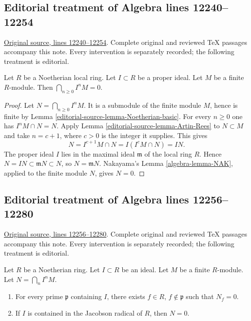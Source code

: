 \subsection{Editorial treatment of Algebra lines 12240--12254}

\hypertarget{algebra-context-161}{}

\noindent\href{https://github.com/stacks/stacks-project/blob/a04446e57ec1fbc252a871afcec7752fb2807b14/algebra.tex\#L12240}{Original source, lines 12240--12254}. Complete original and reviewed TeX passages accompany this note. Every intervention is separately recorded; the following treatment is editorial.


\begin{lemma}
\label{editorial-source-lemma-intersect-powers-ideal-module-zero}
Let $R$ be a Noetherian local ring. Let $I \subset R$ be
a proper ideal. Let $M$ be a finite $R$-module.
Then $\bigcap_{n \geq 0} I^nM = 0$.
\end{lemma}

\begin{proof}
Let $N=\bigcap_{n\geq0}I^nM$. It is a submodule of the finite
module $M$, hence is finite by Lemma \ref{editorial-source-lemma-Noetherian-basic}.
For every $n\geq0$ one has $I^nM\cap N=N$.
Apply Lemma \ref{editorial-source-lemma-Artin-Rees} to $N\subset M$ and take
$n=c+1$, where $c>0$ is the integer it supplies. This gives
$$
N=I^{c+1}M\cap N=I(I^cM\cap N)=IN.
$$
The proper ideal $I$ lies in the maximal ideal $\mathfrak m$
of the local ring $R$. Hence
$N=IN\subset\mathfrak mN\subset N$, so
$N=\mathfrak mN$. Nakayama's Lemma \ref{algebra-lemma-NAK}, applied
to the finite module $N$, gives $N=0$.
\end{proof}


\subsection{Editorial treatment of Algebra lines 12256--12280}

\hypertarget{algebra-context-162}{}

\noindent\href{https://github.com/stacks/stacks-project/blob/a04446e57ec1fbc252a871afcec7752fb2807b14/algebra.tex\#L12256}{Original source, lines 12256--12280}. Complete original and reviewed TeX passages accompany this note. Every intervention is separately recorded; the following treatment is editorial.


\begin{lemma}
\label{editorial-source-lemma-intersection-powers-ideal-module}
Let $R$ be a Noetherian ring. Let $I \subset R$ be an ideal.
Let $M$ be a finite $R$-module. Let $N = \bigcap_n I^n M$.
\begin{enumerate}
\item For every prime $\mathfrak p$ containing $I$, there
exists $f \in R$, $f \not \in \mathfrak p$ such that $N_f = 0$.
\item If $I$ is contained in the Jacobson radical
of $R$, then $N = 0$.
\end{enumerate}
\end{lemma}


